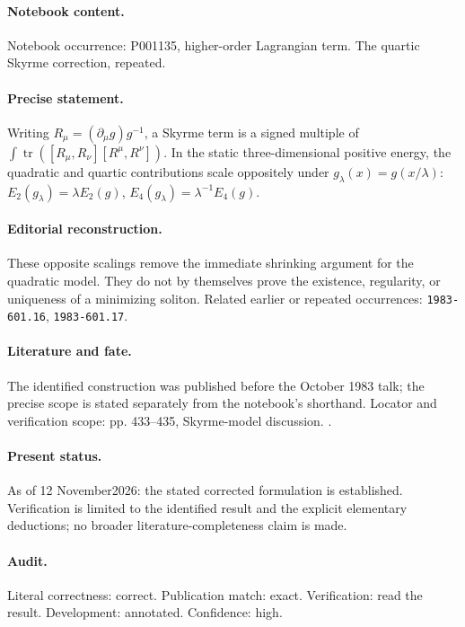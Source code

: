 \paragraph{Notebook content.} Notebook occurrence: P001135, higher-order Lagrangian term. The quartic Skyrme correction, repeated.

\paragraph{Precise statement.} Writing \(R_\mu=(\partial_\mu g)g^{-1}\), a Skyrme term is a signed multiple of \(\int\operatorname{tr}([R_\mu,R_\nu][R^\mu,R^\nu])\). In the static three-dimensional positive energy, the quadratic and quartic contributions scale oppositely under \(g_\lambda(x)=g(x/\lambda)\): \(E_2(g_\lambda)=\lambda E_2(g)\), \(E_4(g_\lambda)=\lambda^{-1}E_4(g)\).

\paragraph{Editorial reconstruction.} These opposite scalings remove the immediate shrinking argument for the quadratic model. They do not by themselves prove the existence, regularity, or uniqueness of a minimizing soliton. Related earlier or repeated occurrences: \texttt{1983-601.16}, \texttt{1983-601.17}.

\paragraph{Literature and fate.} The identified construction was published before the October 1983 talk; the precise scope is stated separately from the notebook's shorthand. Locator and verification scope: pp. 433--435, Skyrme-model discussion. \cite{witten1983current}.

\paragraph{Present status.} As of 12 November2026: the stated corrected formulation is established. Verification is limited to the identified result and the explicit elementary deductions; no broader literature-completeness claim is made.

\paragraph{Audit.} Literal correctness: correct. Publication match: exact. Verification: read the result. Development: annotated. Confidence: high.

